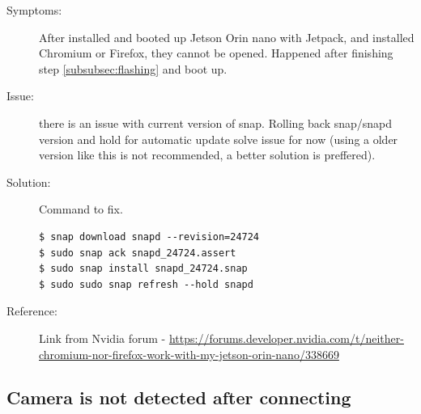 \documentclass[12pt,hidelinks]{article}
\begin{document}
    
    \begin{description}
        \item[Symptoms:] After installed and booted up Jetson Orin nano with Jetpack, and installed Chromium or Firefox, they cannot be opened. Happened after finishing step \ref{subsubsec:flashing} and boot up.
        \item[Issue:] there is an issue with current version of snap. Rolling back snap/snapd version and hold for automatic update solve issue for now (using a older version like this is not recommended, a better solution is preffered).
        \item[Solution:] Command to fix.
        
        \begin{lstlisting}[style=bashstyle]
$ snap download snapd --revision=24724
$ sudo snap ack snapd_24724.assert
$ sudo snap install snapd_24724.snap
$ sudo sudo snap refresh --hold snapd
        \end{lstlisting}

        \item[Reference:] Link from Nvidia forum - {\footnotesize \url{https://forums.developer.nvidia.com/t/neither-chromium-nor-firefox-work-with-my-jetson-orin-nano/338669}}

    \end{description}

    \subsection{Camera is not detected after connecting}
    \label{subsec:camera_not_detected}
\end{document}
